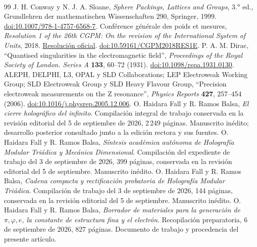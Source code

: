 \begin{thebibliography}{99}
 J. H. Conway y N. J. A. Sloane, \emph{Sphere Packings, Lattices and Groups}, 3.\textsuperscript{a} ed., Grundlehren der mathematischen Wissenschaften 290, Springer, 1999. \href{https://doi.org/10.1007/978-1-4757-6568-7}{doi:10.1007/978-1-4757-6568-7}.
 Conférence générale des poids et mesures, \emph{Resolution 1 of the 26th CGPM: On the revision of the International System of Units}, 2018. \href{https://www.bipm.org/en/committees/cg/cgpm/26-2018/resolution-1}{Resolución oficial}. \href{https://doi.org/10.59161/CGPM2018RES1E}{doi:10.59161/CGPM2018RES1E}.
 P. A. M. Dirac, ``Quantised singularities in the electromagnetic field'', \emph{Proceedings of the Royal Society of London. Series A} \textbf{133}, 60--72 (1931). \href{https://doi.org/10.1098/rspa.1931.0130}{doi:10.1098/rspa.1931.0130}.
 ALEPH, DELPHI, L3, OPAL y SLD Collaborations; LEP Electroweak Working Group; SLD Electroweak Group y SLD Heavy Flavour Group, ``Precision electroweak measurements on the Z resonance'', \emph{Physics Reports} \textbf{427}, 257--454 (2006). \href{https://doi.org/10.1016/j.physrep.2005.12.006}{doi:10.1016/j.physrep.2005.12.006}.
 O. Haidara Fall y R. Ramos Balsa, \emph{El cierre holográfico del infinito}. Compilación integral de trabajo conservada en la revisión editorial del 5 de septiembre de 2026, 2\,249 páginas. Manuscrito inédito; desarrollo posterior consultado junto a la edición rectora y sus fuentes.
 O. Haidara Fall y R. Ramos Balsa, \emph{Síntesis académica autónoma de Holografía Modular Triádica y Mecánica Dimensional}. Compilación del expediente de trabajo del 3 de septiembre de 2026, 399 páginas, conservada en la revisión editorial del 5 de septiembre. Manuscrito inédito.
 O. Haidara Fall y R. Ramos Balsa, \emph{Cadena compacta y rectificación probatoria de Holografía Modular Triádica}. Compilación de trabajo del 3 de septiembre de 2026, 144 páginas, conservada en la revisión editorial del 5 de septiembre. Manuscrito inédito.
 O. Haidara Fall y R. Ramos Balsa, \emph{Borrador de materiales para la generación de \(\pi,\varphi,e\), la constante de estructura fina y el electrón}. Recopilación preparatoria, 6 de septiembre de 2026, 827 páginas. Documento de trabajo y procedencia del presente artículo.
\end{thebibliography}
